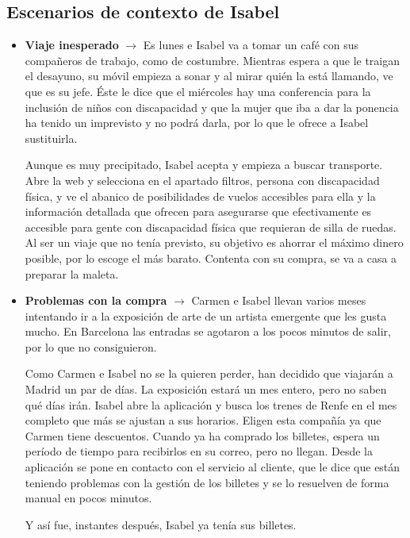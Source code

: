 \subsection{Escenarios de contexto de Isabel}
\begin{itemize}
      \item \textbf{Viaje inesperado} $\rightarrow$ Es lunes e Isabel va a tomar un café con sus compañeros de trabajo, como de costumbre. Mientras espera a que le traigan el desayuno, su móvil empieza a sonar y al mirar quién la está llamando, ve que es su jefe. Éste le dice que el miércoles hay una conferencia para la inclusión de niños con discapacidad y que la mujer que iba a dar la ponencia ha tenido un imprevisto y no podrá darla, por lo que le ofrece a Isabel sustituirla.

            Aunque es muy precipitado, Isabel acepta y empieza a buscar transporte. Abre la
            web y selecciona en el apartado filtros, persona con discapacidad
            física, y ve el abanico de posibilidades de vuelos accesibles para ella y la
            información detallada que ofrecen para asegurarse que efectivamente es
            accesible para gente con discapacidad física que requieran de silla de ruedas.
            Al ser un viaje que no tenía previsto, su objetivo es ahorrar el máximo dinero
            posible, por lo escoge el más barato. Contenta con su compra, se va a casa a
            preparar la maleta.

      \item \textbf{Problemas con la compra} $\rightarrow$ Carmen e Isabel llevan varios meses intentando ir a la exposición de arte de un artista emergente que les gusta mucho. En Barcelona las entradas se agotaron a los pocos minutos de salir, por lo que no consiguieron.

            Como Carmen e Isabel no se la quieren perder, han decidido que viajarán a
            Madrid un par de días. La exposición estará un mes entero, pero no saben qué
            días irán. Isabel abre la aplicación y busca los trenes de Renfe en el mes
            completo que más se ajustan a sus horarios. Eligen esta compañía ya que Carmen
            tiene descuentos. Cuando ya ha comprado los billetes, espera un período de
            tiempo para recibirlos en su correo, pero no llegan. Desde la aplicación se
            pone en contacto con el servicio al cliente, que le dice que están teniendo
            problemas con la gestión de los billetes y se lo resuelven de forma manual en
            pocos minutos.

            Y así fue, instantes después, Isabel ya tenía sus billetes.

\end{itemize}

